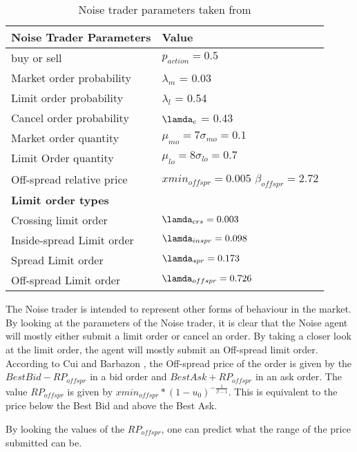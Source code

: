 \begin{table}[h]
\centering
\begin{tabular}{ |m||p{4cm}|} 
\hline
\textbf{Noise Trader Parameters}& \textbf{Value} \\
\hline
\hline
buy or sell & $ p_{action} = 0.5 $ \\ 
\hline
Market order probability & $\lambda_{m}$ = 0.03\\ 
\hline
Limit order probability & $\lambda_{l}$ = 0.54\\ 
\hline
Cancel order probability & $\lamda_{c}$ = 0.43\\
\hline 
Market order quantity & $\mu_{mo} = 7 \sigma_{mo} = 0.1 $\\
\hline
Limit Order quantity &  $\mu_{lo} = 8 \sigma_{lo} = 0.7 $\\
\hline
Off-spread relative price & $xmin_{offspr} =0.005$
\newline 
$\beta_{offspr} = 2.72 $\\
\hline
\textbf{Limit order types} & \\
\hline
Crossing limit order & $\lamda_{crs} = 0.003$\\
\hline 
Inside-spread Limit order & $\lamda_{inspr} = 0.098$\\
\hline 
Spread Limit order & $\lamda_{spr} = 0.173$\\
\hline 
Off-spread Limit order & $\lamda_{offspr} = 0.726$\\
\hline
\end{tabular}
\caption{Noise trader parameters taken from \cite{McGroarty}}
\end{table}
\FloatBarrier 

The Noise trader is intended to represent other forms of behaviour in the market. By looking at the parameters of the Noise trader, it is clear that the Noise agent will mostly either submit a limit order or cancel an order. By taking a closer look at the limit order, the agent will mostly submit an Off-spread limit order. According to Cui and Barbazon \cite{CuiNoise}, the Off-spread price of the order is given by the $BestBid - RP_{offspr}$ in a bid order and $BestAsk + RP_{offspr}$ in an ask order. The value $RP_{offspr}$ is given by $xmin_{offspr} * (1-u_0)^{-\frac{1}{\beta - 1}}$. This is equivalent to the price below the Best Bid and above the Best Ask.

By looking the values of the $RP_{offspr}$, one can predict what the range of the price submitted can be. 

